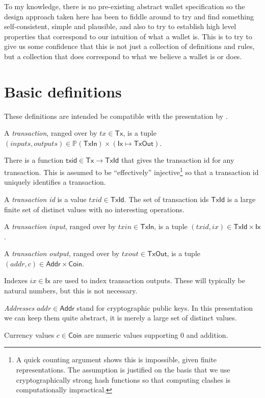 \documentclass{article}
\newcommand{\powerset}[1]{\mathbb{P}(#1)}
\begin{document}
To my knowledge, there is no pre-existing abstract wallet specification so the
design approach taken here has been to fiddle around to try and find something
self-consistent, simple and plausible, and also to try to establish high level
properties that correspond to our intuition of what a wallet is. This is to try
to give us some confidence that this is not just a collection of definitions
and rules, but a collection that does correspond to what we believe a wallet is
or does.

\section{Basic definitions}

These definitions are intended be compatible with the presentation by
\cite{utxo_accounting}.

A \emph{transaction}, ranged over by $tx \in \mathsf{Tx}$, is a tuple
$(inputs, outputs)
   \in \powerset{\mathsf{TxIn}}
   \times (\mathsf{Ix} \mapsto \mathsf{TxOut})$.

There is a function $\mathsf{txid} \in \mathsf{Tx} \to \mathsf{TxId}$ that gives
the transaction id for any transaction. This is assumed to be ``effectively''
injective\footnote{A quick counting argument shows this is impossible, given
finite representations. The assumption is justified on the basis that we use
cryptographically strong hash functions so that computing clashes is
computationally impractical.} so that a transaction id uniquely identifies a
transaction.

A \emph{transaction id} is a value $txid \in \mathsf{TxId}$. The set of
transaction ids $\mathsf{TxId}$ is a large finite set of distinct values with
no interesting operations.

A \emph{transaction input}, ranged over by $txin \in \mathsf{TxIn}$, is a tuple
$(txid, ix) \in \mathsf{TxId} \times \mathsf{Ix}$.

A \emph{transaction output}, ranged over by $txout \in \mathsf{TxOut}$, is a tuple
$(addr, c) \in \mathsf{Addr} \times \mathsf{Coin}$.

Indexes $ix \in \mathsf{Ix}$ are used to index transaction outputs. These will
typically be natural numbers, but this is not necessary.

\emph{Addresses} $addr \in \mathsf{Addr}$ stand for cryptographic public keys. In this
presentation we can keep them quite abstract, it is merely a large set of
distinct values.

Currency values $c \in \mathsf{Coin}$ are numeric values supporting 0 and addition.
\end{document}
